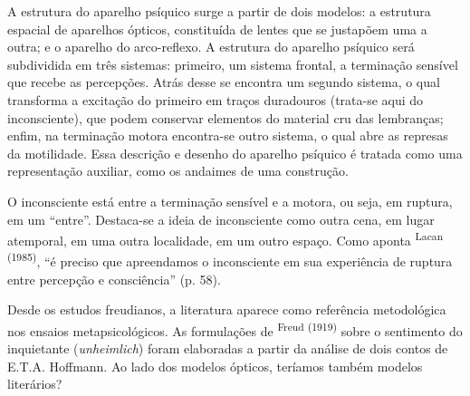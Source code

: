 \begin{multicols}{2}
\par{}A estrutura do aparelho psíquico surge a partir de dois modelos:\allowbreak{} a estrutura espacial de aparelhos ópticos,\allowbreak{} constituída de lentes que se justapõem uma a outra; e o aparelho do arco-\allowbreak{}reflexo.\allowbreak{} A estrutura do aparelho psíquico será subdividida em três sistemas:\allowbreak{} primeiro,\allowbreak{} um sistema frontal,\allowbreak{} a terminação sensível que recebe as percepções.\allowbreak{} Atrás desse se encontra um segundo sistema,\allowbreak{} o qual transforma a excitação do primeiro em traços duradouros (\allowbreak{}trata-\allowbreak{}se aqui do inconsciente)\allowbreak{},\allowbreak{} que podem conservar elementos do material cru das lembranças; enfim,\allowbreak{} na terminação motora encontra-\allowbreak{}se outro sistema,\allowbreak{} o qual abre as represas da motilidade.\allowbreak{} Essa descrição e desenho do aparelho psíquico é tratada como uma representação auxiliar,\allowbreak{} como os andaimes de uma construção.\allowbreak{}\par{}O inconsciente está entre a terminação sensível e a motora,\allowbreak{} ou seja,\allowbreak{} em ruptura,\allowbreak{} em um “entre”.\allowbreak{} Destaca-\allowbreak{}se a ideia de inconsciente como outra cena,\allowbreak{} em lugar atemporal,\allowbreak{} em uma outra localidade,\allowbreak{} em um outro espaço.\allowbreak{} Como aponta \textsuperscript{Lacan (\allowbreak{}1985)\allowbreak{}},\allowbreak{} “é preciso que apreendamos o inconsciente em sua experiência de ruptura entre percepção e consciência” (\allowbreak{}p.\allowbreak{} 58)\allowbreak{}.\allowbreak{}\par{}Desde os estudos freudianos,\allowbreak{} a literatura aparece como referência metodológica nos ensaios metapsicológicos.\allowbreak{} As formulações de \textsuperscript{Freud (\allowbreak{}1919)\allowbreak{}} sobre o sentimento do inquietante (\allowbreak{}\textit{unheimlich})\allowbreak{} foram elaboradas a partir da análise de dois contos de E.\allowbreak{}T.\allowbreak{}A.\allowbreak{} Hoffmann.\allowbreak{} Ao lado dos modelos ópticos,\allowbreak{} teríamos também modelos literários?

\end{multicols}
